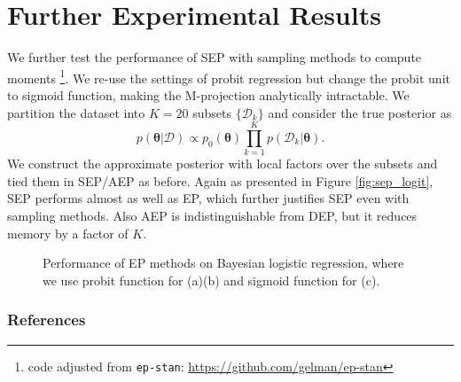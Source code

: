 \documentclass{article} %
\begin{document}
\section{Further Experimental Results}
We further test the performance of SEP with sampling methods to compute moments \footnote{code adjusted from \texttt{ep-stan}: \url{https://github.com/gelman/ep-stan}}. We re-use the settings of probit regression but change the probit unit to sigmoid function, making the M-projection analytically intractable. We partition the dataset into $K = 20$ subsets $\{\mathcal{D}_k\}$ and consider the true posterior as
\begin{equation}
p(\bm{\theta}|\mathcal{D}) \propto p_0(\bm{\theta}) \prod_{k=1}^K p(\mathcal{D}_k|\bm{\theta}).
\end{equation}
We construct the approximate posterior with local factors over the subsets and tied them in SEP/AEP as before. Again as presented in Figure \ref{fig:sep_logit}, SEP performs almost as well as EP, which further justifies SEP even with sampling methods. Also AEP is indistinguishable from DEP, but it reduces memory by a factor of $K$.

\begin{figure}
\centering
%
\def\svgwidth{0.3\linewidth}
\subfigure[\label{fig:sep_logit}]{
}
%
\caption{Performance of EP methods on Bayesian logistic regression, where we use probit function for (a)(b) and sigmoid function for (c).}
\end{figure}

\subsubsection*{References}
\renewcommand{\section}[2]{}


\end{document}
